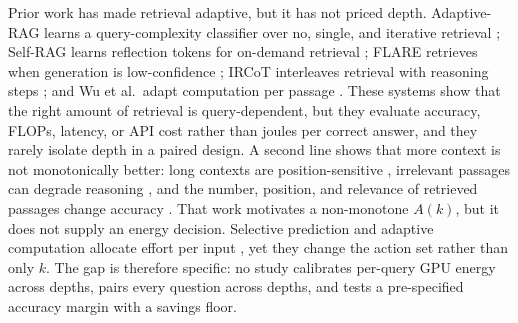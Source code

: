 \documentclass[a4paper,fleqn]{cas-sc}
\begin{document}
Prior work has made retrieval adaptive, but it has not priced depth. Adaptive-RAG learns a query-complexity classifier over no, single, and iterative retrieval \cite{jeong2024adaptiverag}; Self-RAG learns reflection tokens for on-demand retrieval \cite{asai2024selfrag}; FLARE retrieves when generation is low-confidence \cite{jiang2023flare}; IRCoT interleaves retrieval with reasoning steps \cite{trivedi2023ircot}; and Wu et al.\ adapt computation per passage \cite{wu2020dontread}. These systems show that the right amount of retrieval is query-dependent, but they evaluate accuracy, FLOPs, latency, or API cost rather than joules per correct answer, and they rarely isolate depth in a paired design. A second line shows that more context is not monotonically better: long contexts are position-sensitive \cite{liu2023lost}, irrelevant passages can degrade reasoning \cite{shi2023distracted}, and the number, position, and relevance of retrieved passages change accuracy \cite{cuconasu2024noise}. That work motivates a non-monotone $A(k)$, but it does not supply an energy decision. Selective prediction and adaptive computation allocate effort per input \cite{geifman2017selective,schuster2022calm}, yet they change the action set rather than only $k$. The gap is therefore specific: no study calibrates per-query GPU energy across depths, pairs every question across depths, and tests a pre-specified accuracy margin with a savings floor.
\end{document}

